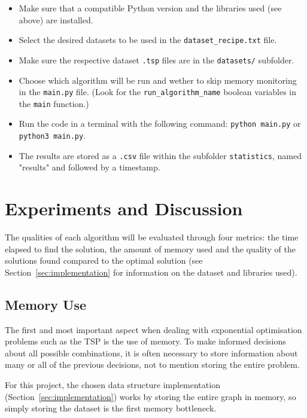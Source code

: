 \documentclass[12pt]{article}
\begin{document}
\begin{itemize}
  \item Make sure that a compatible Python version and the libraries used (see above) are installed.
  \item Select the desired datasets to be used in the \texttt{dataset\_recipe.txt} file.
  \item Make sure the respective dataset \texttt{.tsp} files are in the \texttt{datasets/} subfolder.
  \item Choose which algorithm will be run and wether to skip memory monitoring in the \texttt{main.py} file. (Look for the \texttt{run\_algorithm\_name} boolean variables in the \texttt{main} function.)
  \item Run the code in a terminal with the following command: \texttt{python main.py} or \texttt{python3 main.py}.
  \item The results are stored as a \texttt{.csv} file within the subfolder \texttt{statistics}, named "results" and followed by a timestamp.
\end{itemize}

\section{Experiments and Discussion} \label{sec:experiments}

The qualities of each algorithm will be evaluated through four metrics: the time elapsed 
to find the solution, the amount of memory used and the quality of the solutions found 
compared to the optimal solution (see Section~\ref{sec:implementation} for information 
on the dataset and libraries used).

\subsection{Memory Use} \label{sec:exp_memory}

The first and most important aspect when dealing with exponential optimisation problems such as 
the TSP is the use of memory. To make informed decisions about all possible combinations, 
it is often necessary to store information about many or all of the previous decisions, not to 
mention storing the entire problem.

For this project, the chosen data structure implementation (Section~\ref{sec:implementation}) works by storing 
the entire graph in memory, so simply storing the dataset is the first memory bottleneck.
\end{document}
